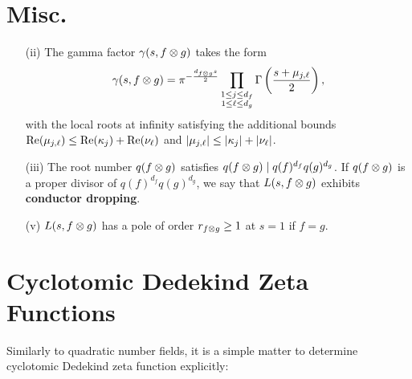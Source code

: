 \documentclass[12pt,oneside]{book}
\begin{document}
  \section{Misc.}
    \begin{itemize}
      \item[(ii)] The gamma factor $\gamma(s,f \otimes g)$ takes the form
      \[
        \gamma(s,f \otimes g) = \pi^{-\frac{d_{f \otimes g}s}{2}}\prod_{\substack{1 \le j \le d_{f} \\ 1 \le \ell \le d_{g}}}\Gamma\left(\frac{s+\mu_{j,\ell}}{2}\right),
      \]
      with the local roots at infinity satisfying the additional bounds $\mathrm{Re}(\mu_{j,\ell}) \le \mathrm{Re}(\kappa_{j})+\mathrm{Re}(\nu_{\ell})$ and $|\mu_{j,\ell}| \le |\kappa_{j}|+|\nu_{\ell}|$.
      \item[(iii)] The root number $q(f \otimes g)$ satisfies $q(f \otimes g) \mid q(f)^{d_{f}}q(g)^{d_{g}}$. If $q(f \otimes g)$ is a proper divisor of $q(f)^{d_{f}}q(g)^{d_{g}}$, we say that $L(s,f \otimes g)$ exhibits \textbf{conductor dropping}.
      \item[(v)] $L(s,f \otimes g)$ has a pole of order $r_{f \otimes g} \ge 1$ at $s = 1$ if $f = g$.
    \end{itemize}
\section{Cyclotomic Dedekind Zeta Functions}
    Similarly to quadratic number fields, it is a simple matter to determine cyclotomic Dedekind zeta function explicitly:
\end{document}
